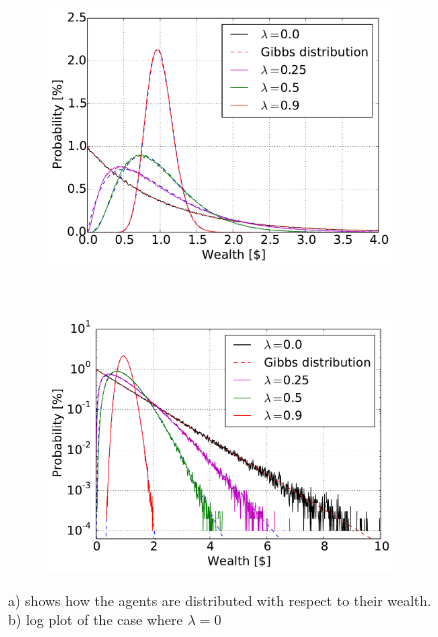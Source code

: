 \begin{figure}[H]
    \centering
    \begin{subfigure}{0.5\textwidth}
        \centering
        \includegraphics[width=\linewidth]{result/bilder/5c}
        \caption{}
        \label{fig:wealthForLambda}
    \end{subfigure}%
    ~ 
    \begin{subfigure}{0.5\textwidth}
        \centering
        \includegraphics[width=\linewidth]{result/bilder/5c-log}
        \caption{}
        \label{fig:wealthForLambdaLog}
    \end{subfigure}
    \caption{a) shows how the agents are distributed with respect to their wealth. b) log plot of the case where $\lambda = 0$}
\end{figure}

